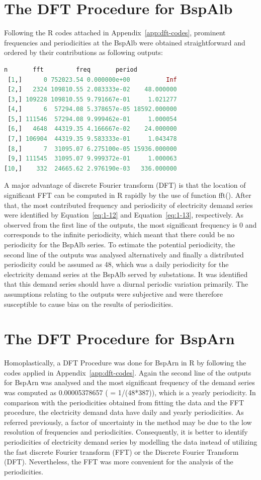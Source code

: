 \documentclass[12pt,msc]{uom_eee_dissertation_casson}
\newcommand{\appref}[1]{Appendix~\ref{#1}}
\newcommand{\eqnref}[1]{Equation~\eqref{#1}}
\begin{document}
\section{The DFT Procedure for BspAlb}
\label{sec:dft-bspalb}
Following the R codes attached in \appref{app:dft-codes}, prominent frequencies and periodicities at the BspAlb were obtained straightforward and ordered by their contributions as following outputs:
\begin{lstlisting}[language=R,breaklines=true]
           n       fft         freq       period
 [1,]      0 752023.54 0.000000e+00          Inf
 [2,]   2324 109810.55 2.083333e-02    48.000000
 [3,] 109228 109810.55 9.791667e-01     1.021277
 [4,]      6  57294.08 5.378657e-05 18592.000000
 [5,] 111546  57294.08 9.999462e-01     1.000054
 [6,]   4648  44319.35 4.166667e-02    24.000000
 [7,] 106904  44319.35 9.583333e-01     1.043478
 [8,]      7  31095.07 6.275100e-05 15936.000000
 [9,] 111545  31095.07 9.999372e-01     1.000063
[10,]    332  24665.62 2.976190e-03   336.000000
\end{lstlisting}

A major advantage of discrete Fourier transform (DFT) is that the location of significant FFT can be computed in R rapidly by the use of function fft(). After that, the most contributed frequency and periodicity of electricity demand series were identified by \eqnref{eq:1-12} and \eqnref{eq:1-13}, respectively. As observed from the first line of the outputs, the most significant frequency is 0 and corresponds to the infinite periodicity, which meant that there could be no periodicity for the BspAlb series. To estimate the potential periodicity, the second line of the outputs was analysed alternatively and finally a distributed periodicity could be assumed as 48, which was a daily periodicity for the electricity demand series at the BspAlb served by substations. It was identified that this demand series should have a diurnal periodic variation primarily. The assumptions relating to the outputs were subjective and were therefore susceptible to cause bias on the results of periodicities.

\section{The DFT Procedure for BspArn}
\label{sec:dft-bsparn}
Homoplastically, a DFT Procedure was done for BspArn in R by following the codes applied in \appref{app:dft-codes}. Again the second line of the outputs for BspArn was analysed and the most significant frequency of the demand series was computed as 0.00005378657 ( = 1/(48*387)), which is a yearly periodicity. In comparison with the periodicities obtained from fitting the data and the FFT procedure, the electricity demand data have daily and yearly periodicities. As referred previously, a factor of uncertainty in the method may be due to the low resolution of frequencies and periodicities. Consequently, it is better to identify periodicities of electricity demand series by modelling the data instead of utilizing the fast discrete Fourier transform (FFT) or the Discrete Fourier Transform (DFT). Nevertheless, the FFT was more convenient for the analysis of the periodicities.
\end{document}
